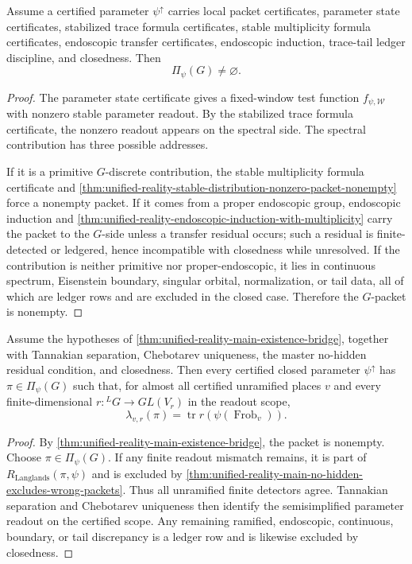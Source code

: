 \begin{theorem}
\label{thm:unified-reality-main-existence-bridge}
Assume a certified parameter $\psi^\uparrow$ carries local packet
certificates, parameter state certificates, stabilized trace formula
certificates, stable multiplicity formula certificates, endoscopic
transfer certificates, endoscopic induction, trace-tail ledger
discipline, and closedness. Then
$$
\Pi_\psi(G)\ne\varnothing.
$$
\end{theorem}
\begin{proof}
The parameter state certificate gives a fixed-window test function
$f_{\psi,\mathcal W}$ with nonzero stable parameter readout. By the
stabilized trace formula certificate, the nonzero readout appears on
the spectral side. The spectral contribution has three possible
addresses.

If it is a primitive $G$-discrete contribution, the stable multiplicity
formula certificate and
\autoref{thm:unified-reality-stable-distribution-nonzero-packet-nonempty}
force a nonempty packet. If it comes from a proper endoscopic group,
endoscopic induction and
\autoref{thm:unified-reality-endoscopic-induction-with-multiplicity}
carry the packet to the $G$-side unless a transfer residual occurs; such
a residual is finite-detected or ledgered, hence incompatible with
closedness while unresolved. If the contribution is neither primitive
nor proper-endoscopic, it lies in continuous spectrum, Eisenstein
boundary, singular orbital, normalization, or tail data, all of which
are ledger rows and are excluded in the closed case. Therefore the
$G$-packet is nonempty.
\end{proof}

\begin{theorem}
\label{thm:unified-reality-main-bedc-langlands-reciprocity}
Assume the hypotheses of
\autoref{thm:unified-reality-main-existence-bridge}, together with
Tannakian separation, Chebotarev uniqueness, the master no-hidden
residual condition, and closedness. Then every certified closed
parameter $\psi^\uparrow$ has $\pi\in\Pi_\psi(G)$ such that, for almost
all certified unramified places $v$ and every finite-dimensional
$r:{}^LG\to GL(V_r)$ in the readout scope,
$$
\lambda_{v,r}(\pi)
=
\operatorname{tr}r(\psi(\operatorname{Frob}_v)).
$$
\end{theorem}
\begin{proof}
By
\autoref{thm:unified-reality-main-existence-bridge}, the packet is
nonempty. Choose $\pi\in\Pi_\psi(G)$. If any finite readout mismatch
remains, it is part of
$R_{\mathrm{Langlands}}(\pi,\psi)$ and is excluded by
\autoref{thm:unified-reality-main-no-hidden-excludes-wrong-packets}.
Thus all unramified finite detectors agree. Tannakian separation and
Chebotarev uniqueness then identify the semisimplified parameter readout
on the certified scope. Any remaining ramified, endoscopic, continuous,
boundary, or tail discrepancy is a ledger row and is likewise excluded
by closedness.
\end{proof}

